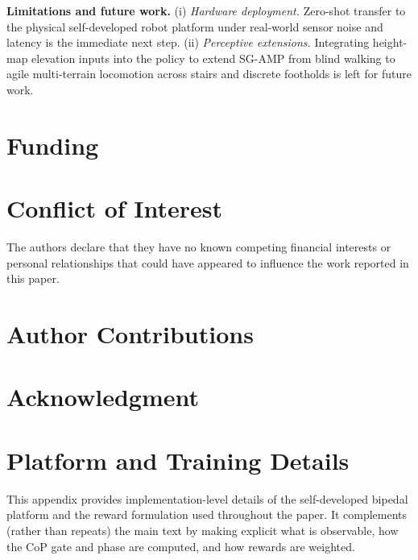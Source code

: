 \documentclass[conference]{IEEEtran}
\begin{document}
\noindent\textbf{Limitations and future work.}
(i) \emph{Hardware deployment.} Zero-shot transfer to the physical self-developed robot platform under real-world sensor noise and latency is the immediate next step. (ii) \emph{Perceptive extensions.} Integrating height-map elevation inputs into the policy to extend SG-AMP from blind walking to agile multi-terrain locomotion across stairs and discrete footholds is left for future work.

\section*{Funding}

\section*{Conflict of Interest}
The authors declare that they have no known competing financial interests or personal relationships that could have appeared to influence the work reported in this paper.

\section*{Author Contributions}

\section*{Acknowledgment}




\clearpage

\appendix
\section{Platform and Training Details}
\label{app:details}

\noindent This appendix provides implementation-level details of the self-developed bipedal platform and the reward formulation used throughout the paper. It complements (rather than repeats) the main text by making explicit what is observable, how the CoP gate and phase are computed, and how rewards are weighted.
\end{document}
